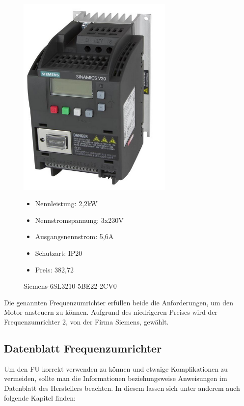 \begin{figure}[H]
\begin{minipage}[t]{0.45\textwidth}
\includegraphics[width=0.68\textwidth]{fig/SiemensV20}
\caption{Siemens-6SL3210-5BE22-2CV0}

\begin{itemize}
	\item{Nennleistung: 2,2kW}
	\item{Nennstromspannung: 3x230V}
	\item{Ausgangsnennstrom: 5,6A}
	\item{Schutzart: IP20}
	\item{Preis: 382,72\textsf{\texteuro} \cite{preisV20}}
\end{itemize}

\end{minipage}
\end{figure}

Die genannten Frequenzumrichter erfüllen beide die Anforderungen, um den Motor ansteuern zu können. Aufgrund des niedrigeren Preises wird der Frequenzumrichter 2, von der Firma Siemens, gewählt. 

\subsection{Datenblatt Frequenzumrichter}
\label{sec:datenblattFrequenzumrichter}

Um den \ac{FU} korrekt verwenden zu können und etwaige Komplikationen zu vermeiden, sollte man die Informationen beziehungsweise Anweisungen im Datenblatt des Herstellers beachten. In diesem lassen sich unter anderem auch folgende Kapitel finden:

